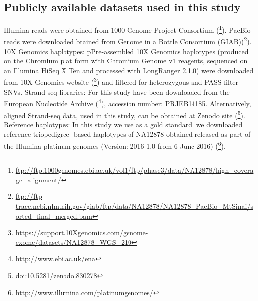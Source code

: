 \subsection{Publicly available datasets used in this study} 
Illumina reads were obtained from 1000 Genome Project Consortium (\footnote{\url{ftp://ftp.1000genomes.ebi.ac.uk/vol1/ftp/phase3/data/NA12878/high_coverage_alignment/}}). 
PacBio reads were downloaded btained from Genome in a Bottle Consortium (GIAB)(\footnote{\url{ftp://ftp trace.ncbi.nlm.nih.gov/giab/ftp/data/NA12878/NA12878_PacBio_MtSinai/sorted_final_merged.bam}}). 
10X Genomics haplotypes: pPre-assembled 10X Genomics haplotypes (produced on the Chromium plat form with Chromium Genome v1 reagents, sequenced on an Illumina HiSeq X Ten and processed with LongRanger 2.1.0) were downloaded from 
10X Genomics website (\footnote{\url{https://support.10Xgenomics.com/genome-exome/datasets/NA12878_WGS_210}}) and filtered for heterozygous and PASS filter SNVs. 
Strand-seq libraries: For this study have been downloaded from the European Nucleotide Archive (\footnote{\url{http://www.ebi.ac.uk/ena}}), accession number: PRJEB14185. 
Alternatively, aligned Strand-seq data, used in this study, can be obtained at Zenodo site (\footnote{\url{doi:10.5281/zenodo.830278}}). 
Reference haplotypes: 
In this study we use as a gold standard, we downloaded reference triopedigree- based haplotypes of NA12878 obtained released as part of the Illumina platinum genomes (Version: 2016-1.0 from 6 June 2016) (\footnote{http://www.illumina.com/platinumgenomes/}).

